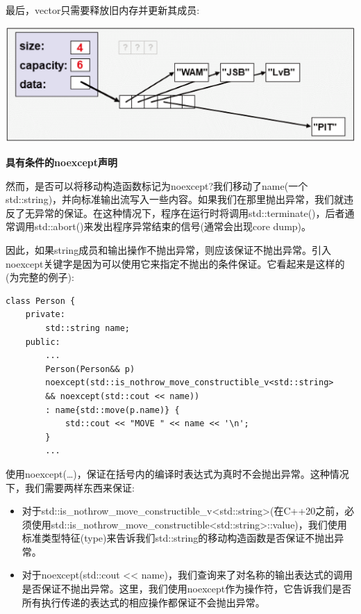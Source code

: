 最后，vector只需要释放旧内存并更新其成员:\par

\begin{center}
	\includegraphics[width=1.0\textwidth]{content/1/chapter7/images/6}
\end{center}

\hspace*{\fill} \par %
\textbf{具有条件的noexcept声明}

然而，是否可以将移动构造函数标记为noexcept?我们移动了name(一个std::string)，并向标准输出流写入一些内容。如果我们在那里抛出异常，我们就违反了无异常的保证。在这种情况下，程序在运行时将调用std::terminate()，后者通常调用std::abort()来发出程序异常结束的信号(通常会出现core dump)。\par

因此，如果string成员和输出操作不抛出异常，则应该保证不抛出异常。引入noexcept关键字是因为可以使用它来指定不抛出的条件保证。它看起来是这样的({\color{red}{basics/personcond.hpp}}为完整的例子):\par

\begin{lstlisting}[caption={}]
class Person {
	private:
		std::string name;
	public:
		...
		Person(Person&& p)
		noexcept(std::is_nothrow_move_constructible_v<std::string>
		&& noexcept(std::cout << name))
		: name{std::move(p.name)} {
			std::cout << "MOVE " << name << '\n';
		}
		...
\end{lstlisting}

使用noexcept(…)，保证在括号内的编译时表达式为真时不会抛出异常。这种情况下，我们需要两样东西来保证:\par

\begin{itemize}
	\item 对于std::is\_nothrow\_move\_constructible\_v<std::string>(在C++20之前，必须使用std::is\_nothrow\_move\_constructible<std::string>::value)，我们使用标准类型特征(type)来告诉我们std::string的移动构造函数是否保证不抛出异常。
	\item 对于noexcept(std::cout << name)，我们查询来了对名称的输出表达式的调用是否保证不抛出异常。这里，我们使用noexcept作为操作符，它告诉我们是否所有执行传递的表达式的相应操作都保证不会抛出异常。
\end{itemize}

